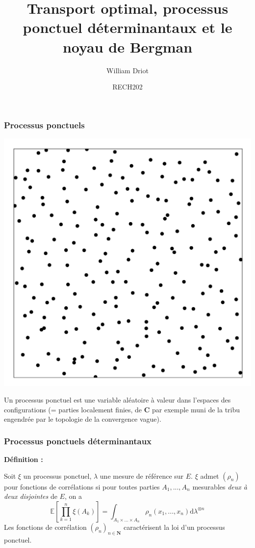\documentclass[9pt]{beamer}
\title{Transport optimal, processus ponctuel déterminantaux et le noyau de Bergman}
\date{RECH202}
\author{William Driot}
\begin{document}
\begin{frame}

\titlepage

\end{frame}\begin{frame}\frametitle{Processus ponctuels}

    \begin{center}

    \includegraphics[scale=1]{Points trimmed.jpg}

    
    Un processus ponctuel est une variable aléatoire à valeur dans l'espaces des \og configurations \fg (= parties localement finies, de $ \mathbf C $ par exemple muni de la tribu engendrée par le topologie de la convergence vague).
    \end{center}

\end{frame}\begin{frame}\frametitle{Processus ponctuels déterminantaux}

    \textbf{Définition :}

    Soit $\xi $ un processus ponctuel, $ \lambda $ une mesure de référence sur $E$. $ \xi $  admet $(\rho_n) $ pour fonctions de corrélations si pour toutes parties $A_1,...,A_n$ mesurables \textit{deux à deux disjointes} de $E$, on a $$ \mathbb E \left[ \prod_{k=1}^n \xi(A_k) \right] = \int_{A_1\times ... \times A_n} \rho_n(x_1,...,x_n) \mathrm d \lambda^{\otimes n} $$ Les fonctions de corrélation $ (\rho_n)_{n \in \mathbf N}$ caractérisent la loi d'un processus ponctuel.


\end{frame}
\end{document}

